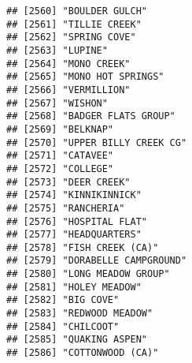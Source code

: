 \documentclass[
]{article}
\begin{document}
\begin{verbatim}
## [2560] "BOULDER GULCH"                                                                       
## [2561] "TILLIE CREEK"                                                                        
## [2562] "SPRING COVE"                                                                         
## [2563] "LUPINE"                                                                              
## [2564] "MONO CREEK"                                                                          
## [2565] "MONO HOT SPRINGS"                                                                    
## [2566] "VERMILLION"                                                                          
## [2567] "WISHON"                                                                              
## [2568] "BADGER FLATS GROUP"                                                                  
## [2569] "BELKNAP"                                                                             
## [2570] "UPPER BILLY CREEK CG"                                                                
## [2571] "CATAVEE"                                                                             
## [2572] "COLLEGE"                                                                             
## [2573] "DEER CREEK"                                                                          
## [2574] "KINNIKINNICK"                                                                        
## [2575] "RANCHERIA"                                                                           
## [2576] "HOSPITAL FLAT"                                                                       
## [2577] "HEADQUARTERS"                                                                        
## [2578] "FISH CREEK (CA)"                                                                     
## [2579] "DORABELLE CAMPGROUND"                                                                
## [2580] "LONG MEADOW GROUP"                                                                   
## [2581] "HOLEY MEADOW"                                                                        
## [2582] "BIG COVE"                                                                            
## [2583] "REDWOOD MEADOW"                                                                      
## [2584] "CHILCOOT"                                                                            
## [2585] "QUAKING ASPEN"                                                                       
## [2586] "COTTONWOOD (CA)"                                                                     

\end{verbatim}
\end{document}
